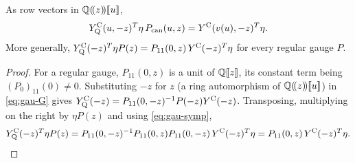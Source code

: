 \begin{cor}
\label{cor:gau-Gstar}
As row vectors in $\mathbb{Q}(\!(z)\!)[\![ u ]\!]$,
\[
Y^{\mathrm{C}}_{\mathrm{Q}}(u,-z)^T\eta\,P_{\mathrm{can}}(u,z)=Y^{\mathrm{C}}(v(u),-z)^T\eta .
\]
More generally, $Y^{\mathrm{C}}_{\mathrm{Q}}(-z)^T\eta P(z)=P_{11}(0,z)\,Y^{\mathrm{C}}(-z)^T\eta$ for every regular gauge $P$.
\end{cor}

\begin{proof}
For a regular gauge, $P_{11}(0,z)$ is a unit of $\mathbb{Q}[\![ z ]\!]$, its constant term being $(P_0)_{11}(0)\neq0$. Substituting $-z$ for $z$ (a ring automorphism of $\mathbb{Q}(\!(z)\!)[\![ u ]\!]$) in \eqref{eq:gau-G} gives $Y^{\mathrm{C}}_{\mathrm{Q}}(-z)=P_{11}(0,-z)^{-1}P(-z)Y^{\mathrm{C}}(-z)$. Transposing, multiplying on the right by $\eta P(z)$ and using \eqref{eq:gau-symp},
\[
Y^{\mathrm{C}}_{\mathrm{Q}}(-z)^T\eta P(z)=P_{11}(0,-z)^{-1}P_{11}(0,z)P_{11}(0,-z)\,Y^{\mathrm{C}}(-z)^T\eta=P_{11}(0,z)\,Y^{\mathrm{C}}(-z)^T\eta .\qedhere
\]
\end{proof}


